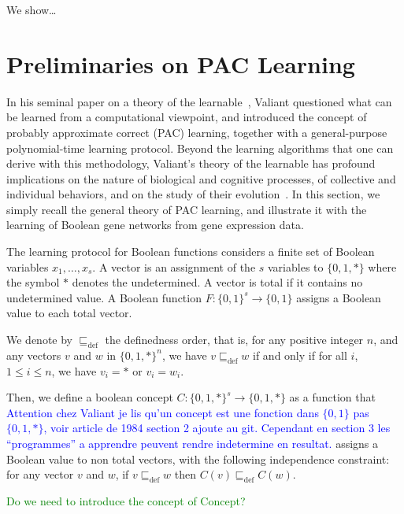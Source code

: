 \documentclass{llncs}
\newcommand{\francois}[1]{\textcolor{blue}{#1}}
\newcommand{\sylvain}[1]{\textcolor{green}{#1}}
\newcommand{\defleq}{\sqsubseteq_{\text{def}}}
\begin{document}
We show\ldots

\section{Preliminaries on PAC Learning}\label{pac}

In his seminal paper on a theory of the learnable~\cite{Valiant84cacm},
Valiant questioned what can be learned from a computational viewpoint,
and introduced the concept of probably approximate correct (PAC) learning,
together with a general-purpose polynomial-time learning protocol.
Beyond the learning algorithms that one can derive with this methodology,
Valiant's theory of the learnable has profound implications
on the nature of biological and cognitive processes,
of collective and individual behaviors,
and on the study of their evolution~\cite{Valiant13book}.
In this section, we simply recall the general theory of PAC learning,
and illustrate it with the learning of Boolean gene networks from gene expression data.

The learning protocol for Boolean functions considers
a finite set of Boolean variables $x_1,\ldots,x_s$.
A vector is an assignment of the $s$ variables to $\{0,1,*\}$
where the symbol $*$ denotes the undetermined.
A vector is total if it contains no undetermined value.
A Boolean function $F:{\{0,1\}}^s \rightarrow\{0,1\}$
assigns a Boolean value to each total vector.

We denote by $\defleq$ the definedness order, that is, for any positive integer $n$, and any vectors $v$ and $w$ in ${\{0,1,*\}}^n$, we have $v \defleq w$ if and only if for all $i$, $1 \leq i \leq n$, we have $v_i = *$ or $v_i = w_i$.

Then, we define a boolean concept $C:{\{0,1,*\}}^s \rightarrow\{0,1,*\}$ as a function that
\francois{Attention chez Valiant je lis qu'un concept est une fonction dans $\{0,1\}$ pas $\{0,1,*\}$, voir article de 1984 section 2 ajoute au git. Cependant en section 3 les ``programmes'' a apprendre peuvent rendre indetermine en resultat.}
assigns a Boolean value to non total vectors,
with the following independence constraint:
for any vector $v$ and $w$, if $v \defleq w$ then $C(v) \defleq C(w)$.

\sylvain{Do we need to introduce the concept of Concept?}
\end{document}
